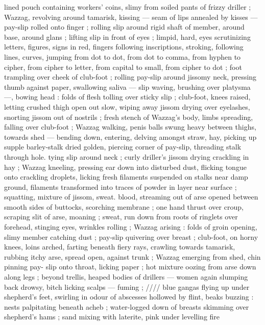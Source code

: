 lined pouch containing workers' coins, slimy from soiled pants of 
frizzy driller ; Wazzag, revolving around tamarisk, kissing --- seam of 
lips annealed by kisses --- pay-slip rolled onto finger ; rolling slip 
around rigid shaft of member, around base, around glans ; lifting slip 
in front of eyes ; limpid, hard, eyes scrutinizing letters, figures, signs 
in red, fingers following inscriptions, stroking, following lines, 
curves, jumping from dot to dot, from dot to comma, from hyphen to 
cipher, from cipher to letter, from capital to small, from cipher to dot 
; foot trampling over cheek of club-foot ; rolling pay-slip around 
jissomy neck, pressing thumb against paper, swallowing saliva --- 
slip waving, brushing over platysma ---, bowing head : folds of flesh 
tolling over sticky slip ; club-foot, knees raised, letting crushed thigh 
open out slow, wiping away jissom drying over eyelashes, snorting 
jissom out of nostrils ; fresh stench of Wazzag's body, limbs 
spreading, falling over club-foot ; Wazzag walking, penis balls swung 
heavy between thighs, towards shed --- bending down, entering, 
delving amongst straw, hay, picking up supple barley-stalk dried 
golden, piercing corner of pay-slip, threading stalk through hole. 
tying slip around neck ; curly driller's jissom drying crackling in hay 
; Wazzag kneeling, pressing ear down into disturbed dust, flicking 
tongue onto crackling droplets, licking fresh filaments suspended on 
stalks near damp ground, filaments transformed into traces of 
powder in layer near surface ; squatting, mixture of jissom, sweat. 
blood, streaming out of arse opened between smooth sides of 
buttocks, scorching membrane ; one hand thrust over croup, scraping 
slit of arse, moaning ; sweat, run down from roots of ringlets over 
forehead, stinging eyes, wrinkles rolling ; Wazzag arising : folds of 
groin opening, slimy member catching dust ; pay-slip quivering over 
breast ; club-foot, on horny knees, loins arched, farting beneath 
fiery rays, crawling towards tamarisk, rubbing itchy arse, spread 
open, against trunk ; Wazzag emerging from shed, chin pinning pay- 
slip onto throat, licking paper ; hot mixture oozing from arse down 
along legs ; beyond trellis, heaped bodies of drillers --- women 
again slumping back drowsy, bitch licking scalps --- fuming ; {\slash}{\slash}{\slash}{\slash} blue 
gangas flying up under shepherd's feet, swirling in odour of 
abscesses hollowed by flint, beaks buzzing : nests palpitating 
beneath acheb ; water-logged down of breasts skimming over 
shepherd's hams ; sand mixing with laterite, pink under levelling fire 
